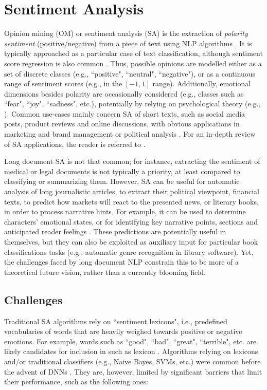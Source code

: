 \documentclass[preprint,review,10pt]{elsarticle}
\begin{document}
	\section{Sentiment Analysis}
	\label{sec::Sentiment}
	Opinion mining (OM) or sentiment analysis (SA) is the extraction of \textit{polarity sentiment} (positive/negative) from a piece of text using NLP algorithms \cite{pakistan, sergio}. It is typically approached as a particular case of text classification, although sentiment score regression is also common \cite{Karamouzas2022}. Thus, possible opinions are modelled either as a set of discrete classes (e.g., ``positive", ``neutral", ``negative"), or as a continuous range of sentiment scores (e.g., in the $[-1, 1]$ range). Additionally, emotional dimensions besides polarity are occasionally considered (e.g., classes such as ``fear", ``joy", ``sadness", etc.), potentially by relying on psychological theory (e.g., \cite{Plutchik2001}). Common use-cases mainly concern SA of short texts, such as social media posts, product reviews and online discussions, with obvious applications in marketing and brand management \cite{sa_example_1, sa_example_2, sa_example_3} or political analysis \cite{sa_example_4, sa_example_5, karamouzas2022SNAM}. For an in-depth review of SA applications, the reader is referred to \cite{sa_applications}.
	
	Long document SA is not that common; for instance, extracting the sentiment of medical or legal documents is not typically a priority, at least compared to classifying or summarizing them. However, SA can be useful for automatic analysis of long journalistic articles, to extract their political viewpoint, financial texts, to predict how markets will react to the presented news, or literary books, in order to process narrative hints. For example, it can be used to determine characters' emotional states, or for identifying key narrative points, sections and anticipated reader feelings \cite{omori}. These predictions are potentially useful in themselves, but they can also be exploited as auxiliary input for particular book classifications tasks (e.g., automatic genre recognition in library software). Yet, the challenges faced by long document NLP constrain this to be more of a theoretical future vision, rather than a currently blooming field.
	
	\subsection{Challenges}
	Traditional SA algorithms rely on ``sentiment lexicons", i.e., predefined vocabularies of words that are heavily weighed towards positive or negative emotions. For example, words such as ``good", ``bad", ``great", ``terrible", etc. are likely candidates for inclusion in such as lexicon \cite{shelly}. Algorithms relying on lexicons and/or traditional classifiers (e.g., Naive Bayes, SVMs, etc.) were common before the advent of DNNs \cite{pang2} \cite{pang}. They are, however, limited by significant barriers that limit their performance, such as the following ones:
	
\end{document}
